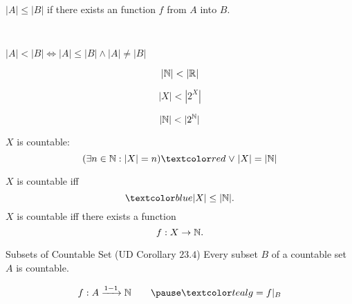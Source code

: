 \begin{frame}{}
\end{frame}

\begin{frame}{}
  \begin{definition}[$|A| \le |B|$]
    $|A| \le |B|$ if there exists an  function $f$ from $A$ into $B$.
  \end{definition}

  \pause
  \vspace{0.80cm}
  \begin{center}
    {} \\[8pt] \pause
    {}
  \end{center}
\end{frame}

\begin{frame}{}
  \begin{definition}[$|A| < |B|$]
    $|A| < |B| \iff |A| \le |B| \land |A| \neq |B|$ 
  \end{definition}

  \pause
  \[
    |\mathbb{N}| < |\mathbb{R}|
  \]

  \[
    |X| < |2^{X}|
  \]

  \[
    |\mathbb{N}| < |2^{\mathbb{N}}|
  \]
\end{frame}

\begin{frame}{}
  \begin{definition}
    $X$ is countable:
    \[
      (\exists n \in \N: |X| = n) \red{\;\lor\;} |X| = |\N|
    \]
  \end{definition}

  \pause
  \begin{theorem}
    $X$ is countable iff
    \[
      \blue{|X| \le |\N|.}
    \]
    \pause
    $X$ is countable iff there exists a  function
    \[
      f: X \to \mathbb{N}.
    \]
  \end{theorem}

  \pause
  \begin{exampleblock}{Subsets of Countable Set (UD Corollary $23.4$)}
    Every subset $B$ of a countable set $A$ is countable.
  \end{exampleblock}

  \pause
  \[
    f: A \xrightarrow{1-1} \N \qquad \pause \teal{g = f|_{B}}
  \]
\end{frame}

